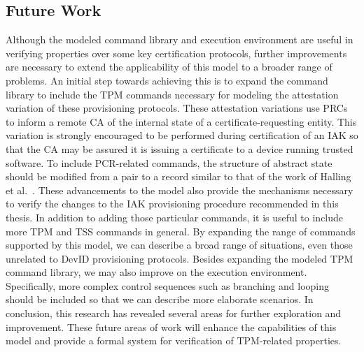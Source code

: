 \documentclass[runningheads]{llncs}
\begin{document}
\subsection{Future Work}
Although the modeled command library and execution environment are useful in verifying properties over some key certification protocols, further improvements are necessary to extend the applicability of this model to a broader range of problems. An initial step towards achieving this is to expand the command library to include the TPM commands necessary for modeling the attestation variation of these provisioning protocols. These attestation variations use PRCs to inform a remote CA of the internal state of a certificate-requesting entity. This variation is strongly encouraged to be performed during certification of an IAK so that the CA may be assured it is issuing a certificate to a device running trusted software. To include PCR-related commands, the structure of abstract state should be modified from a pair to a record similar to that of the work of Halling et al.\ \cite{PrivacyCAAnalysis-Hall}. These advancements to the model also provide the mechanisms necessary to verify the changes to the IAK provisioning procedure recommended in this thesis. In addition to adding those particular commands, it is useful to include more TPM and TSS commands in general. By expanding the range of commands supported by this model, we can describe a broad range of situations, even those unrelated to DevID provisioning protocols.  Besides expanding the modeled TPM command library, we may also improve on the execution environment. Specifically, more complex control sequences such as branching and looping should be included so that we can describe more elaborate scenarios.  In conclusion, this research has revealed several areas for further exploration and improvement. These future areas of work will enhance the capabilities of this model and provide a formal system for verification of TPM-related properties.
%
%
%
\end{document}

